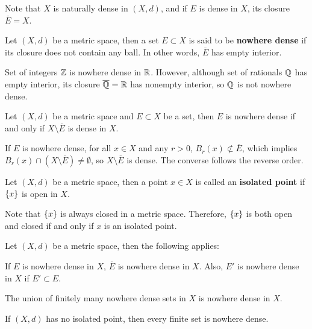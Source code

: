 \documentclass[a4paper,12pt]{article}
\begin{document}
Note that $X$ is naturally dense in $(X,d)$, and if $E$ is dense in $X$, its closure $\overline{E}=X$.\n

\begin{dft}
  Let $(X,d)$ be a metric space, then a set $E\subset X$ is said to be \textbf{nowhere dense} if its closure does not contain any ball. In other words, $\overline{E}$ has empty interior.
\end{dft}\n

\begin{exm}
  Set of integers $\mathbb{Z}$ is nowhere dense in $\mathbb{R}$. However, although set of rationals $\mathbb{Q}$ has empty interior, its closure $\overline{\mathbb{Q}}=\mathbb{R}$ has nonempty interior, so $\mathbb{Q}$ is not nowhere dense.
\end{exm}\n

\begin{pst}
  Let $(X,d)$ be a metric space and $E\subset X$ be a set, then $E$ is nowhere dense if and only if $X\setminus\overline{E}$ is dense in $X$.\n

  \prf If $E$ is nowhere dense, for all $x\in X$ and any $r>0$, $B_{r}(x)\not\subset\overline{E}$, which implies $B_{r}(x)\cap(X\setminus\overline{E})\neq\emptyset$, so $X\setminus\overline{E}$ is dense. The converse follows the reverse order.
\end{pst}\n

\begin{dft}
  Let $(X,d)$ be a metric space, then a point $x\in X$ is called an \textbf{isolated point} if $\left\{ x\right\}$ is open in $X$.
\end{dft}\n

Note that $\left\{ x\right\}$ is always closed in a metric space. Therefore, $\left\{ x\right\}$ is both open and closed if and only if $x$ is an isolated point.\n

\begin{pst}
  Let $(X,d)$ be a metric space, then the following applies:

  \begin{alist}
    \item If $E$ is nowhere dense in $X$, $\overline{E}$ is nowhere dense in $X$. Also, $E'$ is nowhere dense in $X$ if $E'\subset E$.
    \item The union of finitely many nowhere dense sets in $X$ is nowhere dense in $X$.
    \item If $(X,d)$ has no isolated point, then every finite set is nowhere dense.
  \end{alist}
\end{pst}\n
\end{document}
